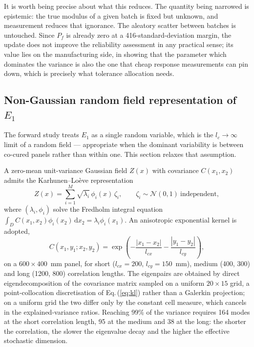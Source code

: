 \documentclass[review,3p,times,12pt,nopreprintline]{elsarticle}
\renewcommand{\eqref}[1]{\textup{{\normalfont Eq.\,(\ref{#1}}\normalfont)}}
\begin{document}
It is worth being precise about what this reduces. The quantity being narrowed is
epistemic: the true modulus of a given batch is fixed but unknown, and measurement reduces
that ignorance. The aleatory scatter between batches is untouched. Since $P_f$ is already
zero at a 416-standard-deviation margin, the update does not improve the reliability
assessment in any practical sense; its value lies on the manufacturing side, in showing
that the parameter which dominates the variance is also the one that cheap response
measurements can pin down, which is precisely what tolerance allocation needs.

\subsection{Non-Gaussian random field representation of $E_1$}
\label{sec:kl}

The forward study treats $E_1$ as a single random variable, which is the $l_c\to\infty$
limit of a random field --- appropriate when the dominant variability is between
co-cured panels rather than within one. This section relaxes that assumption.

A zero-mean unit-variance Gaussian field $Z(x)$ with covariance $C(x_1,x_2)$ admits the
Karhunen--Lo\`{e}ve representation
\begin{equation}
    Z(x) = \sum_{i=1}^{M}\sqrt{\lambda_i}\,\phi_i(x)\,\zeta_i,
    \qquad \zeta_i\sim\mathcal{N}(0,1)\ \text{independent},
    \label{eq:kl}
\end{equation}
where $(\lambda_i,\phi_i)$ solve the Fredholm integral equation
$\int_D C(x_1,x_2)\phi_i(x_2)\,\mathrm{d}x_2=\lambda_i\phi_i(x_1)$. An anisotropic
exponential kernel is adopted,
\begin{equation}
    C(x_1,y_1;x_2,y_2)=\exp\!\left(-\frac{|x_1-x_2|}{l_{cx}}-\frac{|y_1-y_2|}{l_{cy}}\right),
    \label{eq:kernel}
\end{equation}
on a $600\times400$~mm panel, for short ($l_{cx}=200$, $l_{cy}=150$~mm), medium (400, 300)
and long (1200, 800) correlation lengths. The eigenpairs are obtained by direct
eigendecomposition of the covariance matrix sampled on a uniform $20\times15$ grid, a
point-collocation discretisation of \eqref{eq:kl} rather than a Galerkin projection; on a
uniform grid the two differ only by the constant cell measure, which cancels in the
explained-variance ratios. Reaching 99\% of the variance requires 164 modes at the short
correlation length, 95 at the medium and 38 at the long: the shorter the correlation, the
slower the eigenvalue decay and the higher the effective stochastic dimension.
\end{document}
